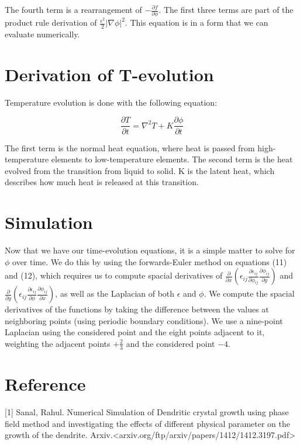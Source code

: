 \documentclass[10pt]{article} %
\begin{document}
The fourth term is a rearrangement of $-\frac{\partial f}{\partial\phi}$. The first three terms are part of the product rule derivation of $\frac{\epsilon^2}{2}|\nabla\phi|^2$. This equation is in a form that we can evaluate numerically.

\section{Derivation of T-evolution}

Temperature evolution is done with the following equation:

\begin{equation}
  \frac{\partial T}{\partial t} = \nabla^2 T + K\frac{\partial\phi}{\partial t}
\end{equation}

The first term is the normal heat equation, where heat is passed from high-temperature elements to low-temperature elements. The second term is the heat evolved from the transition from liquid to solid. K is the latent heat, which describes how much heat is released at this transition.

\section{Simulation}
Now that we have our time-evolution equations, it is a simple matter to solve for $\phi$ over time. We do this by using the forwards-Euler method on equations (11) and (12), which requires us to compute spacial derivatives of $\frac{\partial}{\partial x}\left(\epsilon_{ij}\frac{\partial \epsilon_{ij}}{\partial \phi_{ij}}\frac{\partial \phi_{ij}}{\partial y}\right)$ and $\frac{\partial}{\partial y}\left(\epsilon_{ij}\frac{\partial \epsilon_{ij}}{\partial \phi}\frac{\partial \phi_{ij}}{\partial x}\right)$, as well as the Laplacian of both $\epsilon$ and $\phi$. We compute the spacial derivatives of the functions by taking the difference between the values at neighboring points (using periodic boundary conditions). We use a nine-point Laplacian using the considered point and the eight points adjacent to it, weighting the adjacent points $+\frac{2}{3}$ and the considered point $-4$.

\section{Reference}
        \hspace{2cm}[1] Sanal, Rahul. Numerical Simulation of Dendritic crystal growth using phase field method and investigating the effects of different physical parameter on the growth of the dendrite. Arxiv.<arxiv.org/ftp/arxiv/papers/1412/1412.3197.pdf>\\
\end{document}
